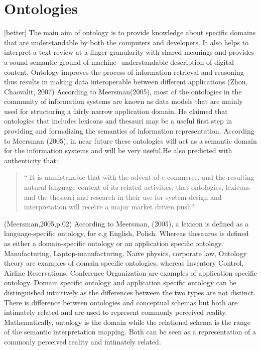 \documentclass[LaM,binding=0.6cm]{sapthesis}
\begin{document}
\section{Ontologies}
[better]
The main aim of ontology is to provide knowledge about specific domains that are understandable
by both the computers and developers. It also helps to interpret a text review at a finger
granularity with shared meanings and provides a sound semantic ground of machine-
understandable description of digital content. Ontology improves the process of information retrieval and reasoning thus
results in making data interoperable between different applications (Zhou, Chaovalit, 2007)
According to Meersman(2005), most of the ontologies in the community of information
systems are known as data models that are mainly used for structuring a fairly narrow
application domain. He claimed that ontologies that includes lexicons and thesauri may be
a useful first step in providing and formalizing the semantics of information
representation. According to Meersman (2005), in near future these ontologies will act as a
semantic domain for the information systems and will be very useful.He also predicted with
authenticity that:
\begin{quote}“ It is unmistakable that with the advent of e-commerce, and the resulting natural language
context of its related activities, that ontologies, lexicons and the thesauri and research in
their use for system design and interpretation will receive a major market driven push”
\end{quote}
(Meersman,2005,p.02)
According to Meersman, (2005), a lexicon is defined as a language-specific ontology, for e.g
English, Polish. Whereas thesaurus is defined as either a domain-specific ontology or an
application specific ontology. Manufacturing, Laptop-manufacturing, Naïve physics,
corporate law, Ontology theory are examples of domain specific ontologies, whereas Inventory
Control, Airline Reservations, Conference Organization are examples of application
specific ontology. Domain specific ontology and application specific ontology can be
distinguished intuitively as the differences between the two types are not distinct. There is
difference between ontologies and conceptual schemas but both are intimately related and are
used to represent commonly perceived reality. Mathematically, ontology is the domain while
the relational schema is the range of the semantic interpretation mapping. Both can be seen as
a representation of a commonly perceived reality and intimately related.
\end{document}
